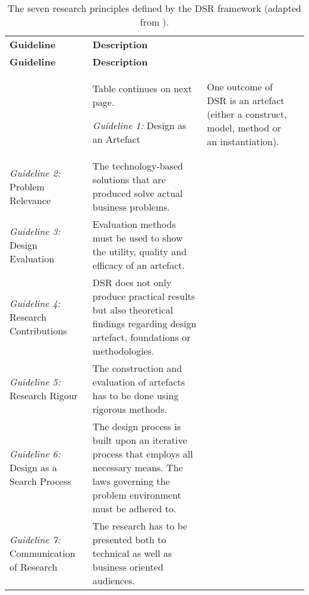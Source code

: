 \begin{longtable}{lXXX}
\label{tab:design_science_guidelines}
\vspace{0.25cm}\\
\toprule
\textbf{Guideline} & \textbf{Description} \\ 
\midrule
\endfirsthead
\toprule
\textbf{Guideline} & \textbf{Description} \\ 
\midrule
\endhead
\midrule
& \hspace*{\fill} \small{Table continues on next page.}
\endfoot
\bottomrule
\caption[The seven research principles defined by the \acs{DSR} framework.]{The seven research principles defined by the \ac{DSR} framework (adapted from \autocite[p. 84]{VonAlanDesignscienceinformation2004}).}
\endlastfoot
\textit{Guideline 1:} Design as an Artefact & One outcome of \ac{DSR} is an artefact (either a construct, model, method or an instantiation). \\
\textit{Guideline 2:} Problem Relevance & The technology-based solutions that are produced solve actual business problems. \\
\textit{Guideline 3:} Design Evaluation & Evaluation methods must be used to show the utility, quality and efficacy of an artefact. \\
\textit{Guideline 4:} Research Contributions & \ac{DSR} does not only produce practical results but also theoretical findings regarding design artefact, foundations or methodologies. \\
\textit{Guideline 5:} Research Rigour & The construction and evaluation of artefacts has to be done using rigorous methods. \\
\textit{Guideline 6:} Design as a Search Process & The design process is built upon an iterative process that employs all necessary means. The laws governing the problem environment must be adhered to.\\
\textit{Guideline 7:} Communication of Research & The research has to be presented both to technical as well as business oriented audiences. \\
\end{longtable}
